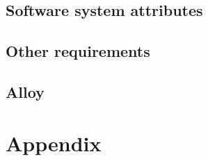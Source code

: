 \documentclass[12pt, a4paper]{report}
\begin{document}
\section{Software system attributes}


\section{Other requirements}


\section{Alloy}


\appendix
\chapter{Appendix}



\end{document}
